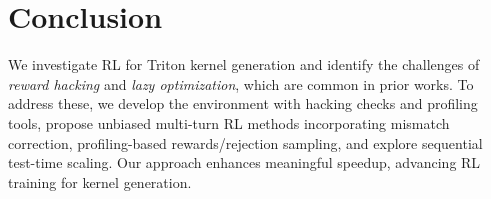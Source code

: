 \section{Conclusion}
We investigate RL for Triton kernel generation and identify the challenges of \emph{reward hacking} and \emph{lazy optimization}, which are common in prior works. To address these, we develop the \env{} environment with hacking checks and profiling tools, propose unbiased multi-turn RL methods incorporating mismatch correction, profiling-based rewards/rejection sampling, and explore sequential test-time scaling. Our approach enhances meaningful speedup, advancing RL training for kernel generation.
